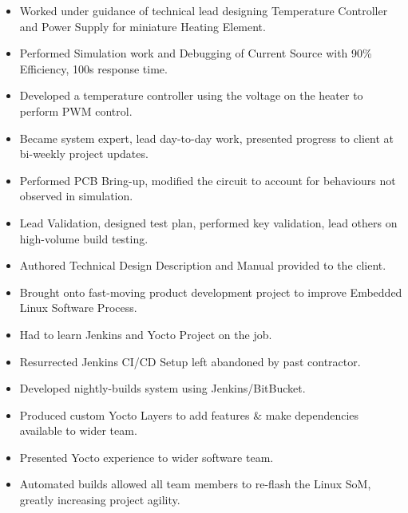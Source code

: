 {
  {\begin{itemize}
    \item Worked under guidance of technical lead designing Temperature Controller and Power Supply for miniature Heating Element. 
    \item Performed Simulation work and Debugging of Current Source with 90\% Efficiency, 100\mu s response time. 
    \item Developed a temperature controller using the voltage on the heater to perform PWM control. 
    \item Became system expert, lead day-to-day work, presented progress to client at bi-weekly project updates.
    \item Performed PCB Bring-up, modified the circuit to account for behaviours not observed in simulation. 
    \item Lead Validation, designed test plan, performed key validation, lead others on high-volume build testing. 
    \item Authored Technical Design Description and Manual provided to the client. 
  \end{itemize} 
  }
}

{
  {\begin{itemize}
    \item Brought onto fast-moving product development project to improve Embedded Linux Software Process.
    \item Had to learn Jenkins and Yocto Project on the job. 
    \item Resurrected Jenkins CI/CD Setup left abandoned by past contractor. 
    \item Developed nightly-builds system using Jenkins/BitBucket.
    \item Produced custom Yocto Layers to add features \& make dependencies available to wider team. 
    \item Presented Yocto experience to wider software team. 
    \item Automated builds allowed all team members to re-flash the Linux SoM, greatly increasing project agility. 
  \end{itemize} 
  }
}

